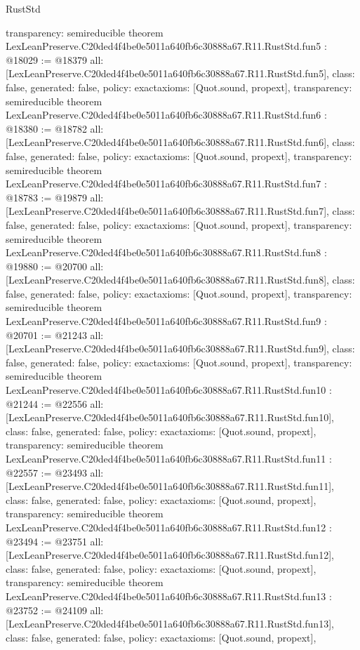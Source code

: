 \begin{lexlean}{RustStd}
\begin{coremodule}
{  transparency: semireducible
}
theorem LexLeanPreserve.C20ded4f4be0e5011a640fb6c30888a67.R11.RustStd.fun5 : @18029 := @18379 {
  all: [LexLeanPreserve.C20ded4f4be0e5011a640fb6c30888a67.R11.RustStd.fun5],
  class: false,
  generated: false,
  policy: exact{axioms: [Quot.sound, propext]},
  transparency: semireducible
}
theorem LexLeanPreserve.C20ded4f4be0e5011a640fb6c30888a67.R11.RustStd.fun6 : @18380 := @18782 {
  all: [LexLeanPreserve.C20ded4f4be0e5011a640fb6c30888a67.R11.RustStd.fun6],
  class: false,
  generated: false,
  policy: exact{axioms: [Quot.sound, propext]},
  transparency: semireducible
}
theorem LexLeanPreserve.C20ded4f4be0e5011a640fb6c30888a67.R11.RustStd.fun7 : @18783 := @19879 {
  all: [LexLeanPreserve.C20ded4f4be0e5011a640fb6c30888a67.R11.RustStd.fun7],
  class: false,
  generated: false,
  policy: exact{axioms: [Quot.sound, propext]},
  transparency: semireducible
}
theorem LexLeanPreserve.C20ded4f4be0e5011a640fb6c30888a67.R11.RustStd.fun8 : @19880 := @20700 {
  all: [LexLeanPreserve.C20ded4f4be0e5011a640fb6c30888a67.R11.RustStd.fun8],
  class: false,
  generated: false,
  policy: exact{axioms: [Quot.sound, propext]},
  transparency: semireducible
}
theorem LexLeanPreserve.C20ded4f4be0e5011a640fb6c30888a67.R11.RustStd.fun9 : @20701 := @21243 {
  all: [LexLeanPreserve.C20ded4f4be0e5011a640fb6c30888a67.R11.RustStd.fun9],
  class: false,
  generated: false,
  policy: exact{axioms: [Quot.sound, propext]},
  transparency: semireducible
}
theorem LexLeanPreserve.C20ded4f4be0e5011a640fb6c30888a67.R11.RustStd.fun10 : @21244 := @22556 {
  all: [LexLeanPreserve.C20ded4f4be0e5011a640fb6c30888a67.R11.RustStd.fun10],
  class: false,
  generated: false,
  policy: exact{axioms: [Quot.sound, propext]},
  transparency: semireducible
}
theorem LexLeanPreserve.C20ded4f4be0e5011a640fb6c30888a67.R11.RustStd.fun11 : @22557 := @23493 {
  all: [LexLeanPreserve.C20ded4f4be0e5011a640fb6c30888a67.R11.RustStd.fun11],
  class: false,
  generated: false,
  policy: exact{axioms: [Quot.sound, propext]},
  transparency: semireducible
}
theorem LexLeanPreserve.C20ded4f4be0e5011a640fb6c30888a67.R11.RustStd.fun12 : @23494 := @23751 {
  all: [LexLeanPreserve.C20ded4f4be0e5011a640fb6c30888a67.R11.RustStd.fun12],
  class: false,
  generated: false,
  policy: exact{axioms: [Quot.sound, propext]},
  transparency: semireducible
}
theorem LexLeanPreserve.C20ded4f4be0e5011a640fb6c30888a67.R11.RustStd.fun13 : @23752 := @24109 {
  all: [LexLeanPreserve.C20ded4f4be0e5011a640fb6c30888a67.R11.RustStd.fun13],
  class: false,
  generated: false,
  policy: exact{axioms: [Quot.sound, propext]},
}
\end{coremodule}
\end{lexlean}
